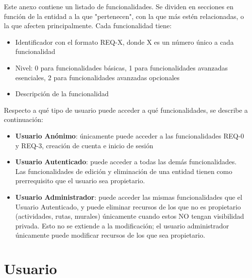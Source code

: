 Este anexo contiene un listado de funcionalidades. Se dividen en secciones en función de la entidad a la que "pertenecen", con la que más estén relacionadas, o la que afecten principalmente. Cada funcionalidad tiene:
\begin{itemize}
    \item Identificador con el formato REQ-X, donde X es un número único a cada funcionalidad
    \item Nivel: 0 para funcionalidades básicas, 1 para funcionalidades avanzadas esenciales, 2 para funcionalidades avanzadas opcionales
    \item Descripción de la funcionalidad
\end{itemize}
Respecto a qué tipo de usuario puede acceder a qué funcionalidades, se describe a continuación:
\begin{itemize}
    \item \textbf{Usuario Anónimo}: únicamente puede acceder a las funcionalidades REQ-0 y REQ-3, creación de cuenta e inicio de sesión
    \item \textbf{Usuario Autenticado}: puede acceder a todas las demás funcionalidades. Las funcionalidades de edición y eliminación de una entidad tienen como prerrequisito que el usuario sea propietario.
    \item \textbf{Usuario Administrador}: puede acceder las mismas funcionalidades que el Usuario Autenticado, y puede eliminar recursos de los que no es propietario (actividades, rutas, murales) únicamente cuando estos NO tengan visibilidad privada. Esto no se extiende a la modificación; el usuario administrador únicamente puede modificar recursos de los que sea propietario.
\end{itemize}

\section{Usuario}

